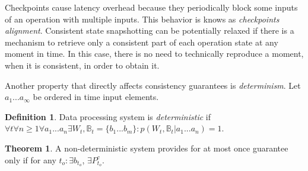 \documentclass[sigconf]{acmart}
\theoremstyle{definition}
\newtheorem{definition}{Definition}
\newtheorem{theorem}{Theorem}
\begin{document}
Checkpoints cause latency overhead because they periodically block some inputs of an operation with multiple inputs. This behavior is knows as {\em checkpoints alignment}. Consistent state snapshotting can be potentially relaxed if there is a mechanism to retrieve only a consistent part of each operation state at any moment in time. In this case, there is no need to technically reproduce a moment, when it is consistent, in order to obtain it.

Another property that directly affects consistency guarantees is {\em determinism}. Let $a_1...a_\infty$ be ordered in time input elements.

\begin{definition}{Data processing system is {\em deterministic}}
if \\
$\forall{t} \forall{n\geq1} \forall{a_1...a_n}\exists{W_t,\mathbb{B}_t={\{b_1...b_m\}}}:p(W_t,\mathbb{B}_t|a_1...a_n)=1$.
\end{definition}

\begin{theorem}
A non-deterministic system provides for at most once guarantee only if for any ${t_o}:\exists{b_{t_o}}$, $\exists{P^{c}_{t_o}}$.  
\end{theorem}
















\end{document}
